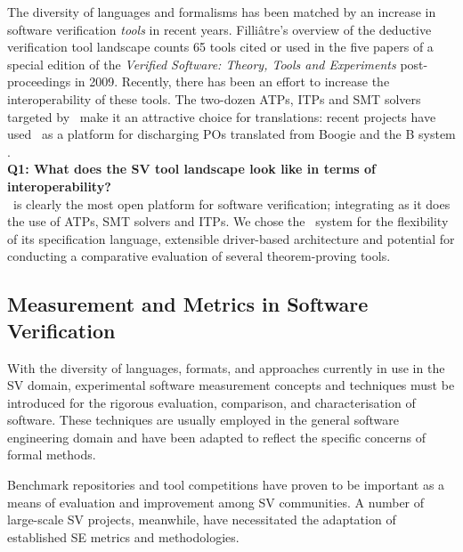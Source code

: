 The diversity of languages and formalisms has been matched by an increase in software verification \textit{tools} in recent years. 
Filli{\^a}tre's overview of the deductive verification tool landscape \cite{deductiveSV} counts 65 tools cited or used in the five papers of a special edition of the \textit{Verified Software: Theory, Tools and Experiments} post-proceedings in 2009. 
Recently, there has been an effort to increase the interoperability of these tools. 
The two-dozen ATPs, ITPs and SMT solvers targeted by \why~make it an attractive choice for translations: recent projects have used \why~as a platform for discharging POs translated from Boogie \cite{b2w} and the B system \cite{rodinplugin,atelierB2w}. \\

\textbf{Q1: What does the SV tool landscape look like in terms of interoperability?} \\
\why~is clearly the most open platform for software verification; integrating as it does the use of ATPs, SMT solvers and ITPs.
We chose the \why~system for the flexibility of its specification language, extensible driver-based architecture and potential for conducting a comparative evaluation of several theorem-proving tools.

\subsection{Measurement and Metrics in Software Verification}
\label{sub:lrsvmm}

With the diversity of languages, formats, and approaches currently in use in the SV domain, experimental software measurement concepts and techniques must be introduced for the rigorous evaluation, comparison, and characterisation of software. These techniques are usually employed in the general software engineering domain and have been adapted to reflect the specific concerns of formal methods. 

Benchmark repositories and tool competitions have proven to be important as a means of evaluation and improvement among SV communities. A number of large-scale SV projects, meanwhile, have necessitated the adaptation of established SE metrics and methodologies.         
 
